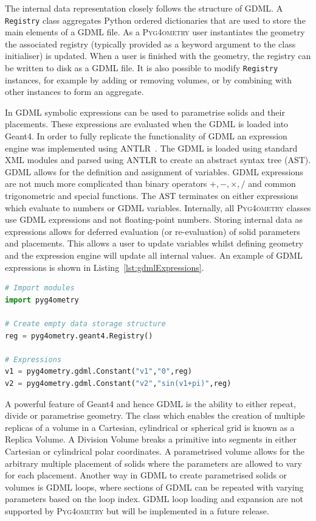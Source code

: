 \documentclass[final,5p,times,twocolumn]{elsarticle}
\newcommand{\PYGEOMETRY}{\textsc{Pyg4ometry}}
\begin{document}
The internal data representation closely follows the structure of GDML. A \verb|Registry| class aggregates Python ordered dictionaries that are  used to store the main
elements of a GDML file. As a \PYGEOMETRY{} user instantiates the geometry the associated registry (typically provided as a keyword argument to the class initialiser) is updated. When a user is finished with the geometry, the registry
can be written to disk as a GDML file. It is also possible to modify \verb|Registry| instances, for example by adding or removing volumes, or by combining with other instances to form an aggregate.

In GDML symbolic expressions can be used to parametrise solids and their placements. These expressions are evaluated when the GDML is loaded into Geant4.
In order to fully replicate the functionality of GDML an expression engine was implemented using ANTLR~\cite{10.5555/2501720}. The GDML is loaded using
standard XML modules and parsed using ANTLR to create an abstract syntax tree (AST).  GDML allows for the definition
and assignment of variables. GDML expressions are not much more complicated than binary operators $+, -, \times, /$ and common trigonometric and special
functions. The AST terminates on either expressions which evaluate to numbers or GDML variables. Internally, all \PYGEOMETRY{}
classes use GDML expressions and not floating-point numbers. Storing internal data as expressions allows for deferred evaluation (or re-evaluation) of
solid parameters and  placements. This allows a user to update variables whilst defining geometry and the expression engine will update all internal values.
An example of GDML expressions is shown in Listing~\ref{lst:gdmlExpressions}.

\begin{lstlisting}[caption={A simple Python script using \PYGEOMETRY{} to create GDML variables.},label={lst:gdmlExpressions}, language=Python]
# Import modules
import pyg4ometry

# Create empty data storage structure
reg = pyg4ometry.geant4.Registry()

# Expressions
v1 = pyg4ometry.gdml.Constant("v1","0",reg)
v2 = pyg4ometry.gdml.Constant("v2","sin(v1+pi)",reg)

\end{lstlisting}


A powerful feature of Geant4 and hence GDML is the ability to either repeat, divide or parametrise geometry. The class which enables the creation of
multiple replicas of a volume in a Cartesian, cylindrical or spherical grid is known as a Replica Volume. A Division Volume breaks a primitive into segments
in either Cartesian or cylindrical polar coordinates. A parametrised volume allows for the arbitrary multiple placement of solids where the parameters are
allowed to vary for each placement.  Another way in GDML to create parametrised solids or volumes is GDML loops, where sections of GDML can be
 repeated with varying parameters based on the loop index. GDML loop loading and expansion are not supported by \PYGEOMETRY{} but will be implemented in a
future release.
\end{document}
